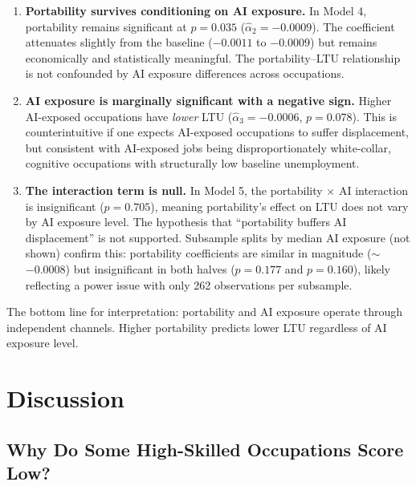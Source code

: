 \documentclass[12pt]{article}
\begin{document}
\begin{enumerate}
    \item \textbf{Portability survives conditioning on AI exposure.} In Model 4, portability remains significant at $p = 0.035$ ($\hat{\alpha}_2 = -0.0009$). The coefficient attenuates slightly from the baseline ($-0.0011$ to $-0.0009$) but remains economically and statistically meaningful. The portability--LTU relationship is not confounded by AI exposure differences across occupations.

    \item \textbf{AI exposure is marginally significant with a negative sign.} Higher AI-exposed occupations have \emph{lower} LTU ($\hat{\alpha}_3 = -0.0006$, $p = 0.078$). This is counterintuitive if one expects AI-exposed occupations to suffer displacement, but consistent with AI-exposed jobs being disproportionately white-collar, cognitive occupations with structurally low baseline unemployment.

    \item \textbf{The interaction term is null.} In Model 5, the portability $\times$ AI interaction is insignificant ($p = 0.705$), meaning portability's effect on LTU does not vary by AI exposure level. The hypothesis that ``portability buffers AI displacement'' is not supported. Subsample splits by median AI exposure (not shown) confirm this: portability coefficients are similar in magnitude ($\sim$$-0.0008$) but insignificant in both halves ($p = 0.177$ and $p = 0.160$), likely reflecting a power issue with only 262 observations per subsample.
\end{enumerate}

The bottom line for interpretation: portability and AI exposure operate through independent channels. Higher portability predicts lower LTU regardless of AI exposure level.

\section{Discussion}
\label{sec:discussion}

\subsection{Why Do Some High-Skilled Occupations Score Low?}
\end{document}
